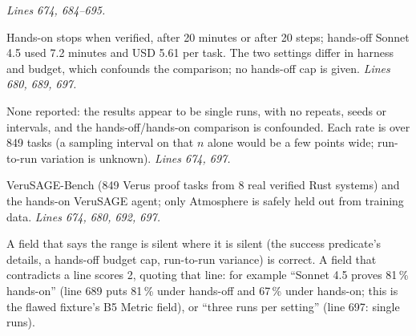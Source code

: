 \documentclass[11pt]{article}
\begin{document}
\begin{description}
  \emph{Lines 674, 684--695.}
\item[Budget.] Hands-on stops when verified, after 20 minutes or after 20
  steps; hands-off Sonnet 4.5 used 7.2 minutes and USD 5.61 per task. The two
  settings differ in harness and budget, which confounds the comparison; no
  hands-off cap is given. \emph{Lines 680, 689, 697.}
\item[Variance.] None reported: the results appear to be single runs, with no
  repeats, seeds or intervals, and the hands-off/hands-on comparison is
  confounded. Each rate is over 849 tasks (a sampling interval on that $n$
  alone would be a few points wide; run-to-run variation is unknown).
  \emph{Lines 674, 697.}
\item[Artifact.] VeruSAGE-Bench (849 Verus proof tasks from 8 real verified
  Rust systems) and the hands-on VeruSAGE agent; only Atmosphere is safely
  held out from training data. \emph{Lines 674, 680, 692, 697.}
\end{description}
A field that says the range is silent where it is silent (the success
predicate's details, a hands-off budget cap, run-to-run variance) is correct.
A field that contradicts a line scores 2, quoting that line: for example
``Sonnet 4.5 proves 81\,\% hands-on'' (line 689 puts 81\,\% under hands-off and
67\,\% under hands-on; this is the flawed fixture's B5 Metric field), or ``three
runs per setting'' (line 697: single runs).
\end{document}
